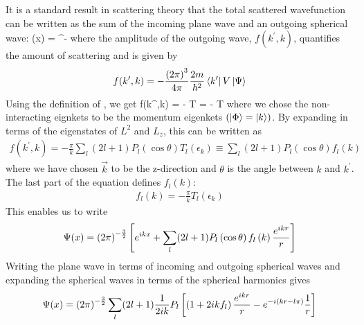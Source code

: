 \documentclass[12pt,twoside]{article}
\numberwithin{equation}{section}
\begin{document}
It is a standard result in scattering theory that the total scattered wavefunction can be written as the sum of the incoming plane wave and an outgoing spherical wave:
\beq
\Psi(x) = \rr{2\pi}^{-}
\eeq
where the amplitude of the outgoing wave, \(f(k^\prime,k)\), quantifies the amount of scattering and is given by
\begin{equation}\begin{aligned}
	f(k^\prime, k) = - \frac{\left( 2\pi \right) ^3}{4\pi} \frac{2m}{\hbar^2}\bra{k^\prime}V\ket{\Psi}
\end{aligned}\end{equation}
Using the definition of , we get
\beq
\label{f_in_T}
f(k^\prime,k) = -  T\ket{\Phi} = - T
\eeq
where we chose the non-interacting eignkets to be the momentum eigenkets \(\left( \ket{\Phi} = \ket{k} \right) \). By expanding in terms of the eigenstates of \(L^2\) and \(L_z\), this can be written as
\begin{equation}\begin{aligned}
	f(k^\prime,k) = - \frac{\pi}{k}\sum_l (2l+1)P_l\left( \cos \theta \right) T_l(\epsilon_k) \equiv \sum_l (2l+1)P_l\left( \cos \theta \right) f_l\left( k \right) 
\end{aligned}\end{equation}
where we have chosen \(\vec k\) to be the z-direction and \(\theta\) is the angle between \(k\) and \(k^\prime\). The last part of the equation defines \(f_l(k)\):
\begin{equation}\begin{aligned}
	f_l(k) = - \frac{\pi}{k} T_l(\epsilon_k)
\end{aligned}\end{equation}
This enables us to write
\begin{equation}\begin{aligned}
	\Psi(x) = \left({2\pi}\right)^{-\frac{3}{2}}\left[{e^{ikx} + \sum_l (2l+1)P_l\left( \cos \theta \right) f_l\left(k\right) \frac{e^{ikr}}{r}}\right]
\end{aligned}\end{equation}
Writing the plane wave in terms of incoming and outgoing spherical waves and expanding the spherical waves in terms of the spherical harmonics gives
\begin{equation}\begin{aligned}
	\Psi(x) = \left({2\pi}\right)^{-\frac{3}{2}}\sum_l (2l+1) \frac{1}{2ik}P_l\left[\left(1 + 2i k f_l \right) \frac{e^{ikr}}{r} - e^{-i\left( kr - l\pi \right) } \frac{1}{r}\right]
\end{aligned}\end{equation}
\end{document}
